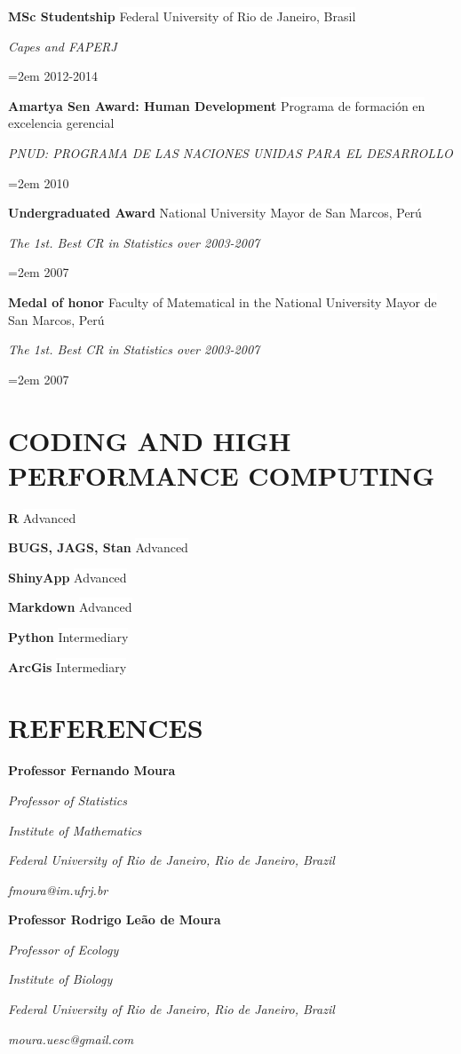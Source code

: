\documentclass[paper=a4,fontsize=11pt]{scrartcl}	 			%
\newcommand{\sepspace}{\vspace*{1em}}			%
\newcommand{\NewPart}[1]{\section*{\uppercase{#1}}}
\newcommand{\EducationEntry}[4]{
		\noindent \textbf{#1} \hfill 					%
		\colorbox{White}{%
			\parbox{10em}{%
			\hfill\color{Black}#2}} \par				%
		\noindent \textit{#3} \par					%
		\noindent\hangindent=2em\hangafter=0 \small #4 	%
		\normalsize \par}
\newcommand{\WorkEntry}[4]{						%
		\noindent \textbf{#1} \hfill 					%
		\colorbox{White}{\color{Black}#2} \par		%
		\noindent \textit{#3} \par					%
		\noindent\hangindent=2em\hangafter=0 \small #4 	%
		\normalsize \par}
\newcommand{\RefEntry}[7]{						%
		\noindent \textbf{#1} \par 					%
		\noindent \textit{#2} \par	%
		\noindent \textit{#3} \par
		\noindent \textit{#4} \par%
		\noindent \textit{#5} \par
		\noindent \textit{#6} \par
		\noindent \textit{#7} \par}
\newcommand{\codeEntry}[2]{						%
		\noindent \textbf{#1} \hfill 					%
		\colorbox{White}{\color{Black}#2} \par		%
		}
\begin{document}
\WorkEntry{MSc Studentship}{Federal University of Rio de Janeiro, Brasil}{Capes and FAPERJ }{2012-2014}
\sepspace

\WorkEntry{Amartya Sen Award: Human Development}{Programa de formaci\'{o}n en excelencia gerencial}{PNUD: PROGRAMA DE LAS NACIONES UNIDAS PARA EL DESARROLLO}{2010}
\sepspace

\WorkEntry{Undergraduated Award}{National University Mayor de San Marcos, Per\'{u}}{The 1st. Best CR in Statistics over 2003-2007}{2007}
\sepspace

\WorkEntry{Medal of honor}{Faculty of Matematical in the National University Mayor de San Marcos, Per\'{u}}{The 1st. Best CR in Statistics over 2003-2007}{2007}
\sepspace

\NewPart{Coding and High Performance Computing}
\codeEntry{R}{Advanced}
\codeEntry{BUGS, JAGS, Stan}{Advanced}
\codeEntry{ShinyApp}{Advanced}
\codeEntry{Markdown}{Advanced}
\codeEntry{Python}{Intermediary}
\codeEntry{ArcGis}{Intermediary}




\NewPart{References}



\RefEntry{Professor Fernando Moura}
{Professor of Statistics}
{Institute of Mathematics}
{Federal University of Rio de Janeiro, Rio de Janeiro, Brazil}
{fmoura@im.ufrj.br}
{}
{}

\RefEntry{Professor Rodrigo Le\~{a}o de Moura}
{Professor of Ecology}
{Institute of Biology}
{Federal University of Rio de Janeiro, Rio de Janeiro, Brazil}
{moura.uesc@gmail.com}
{}
{}


\end{document}
